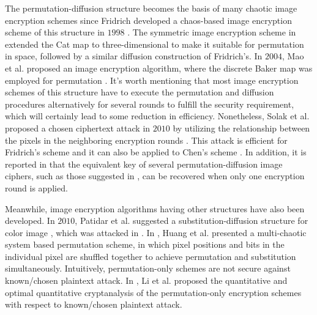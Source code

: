 \documentclass[3p,preprint,11pt]{elsarticle}
\begin{document}
The permutation-diffusion structure becomes the basis of many chaotic image encryption schemes
since Fridrich developed a chaos-based image encryption scheme of this structure in $1998$
\cite{Fridrich:ChaoticImageEncryption:IJBC98}.
The symmetric image encryption scheme in \cite{Chen:3DChaoticCipher:CSF04} extended the Cat map to
three-dimensional to make it suitable for permutation in space, followed by a similar diffusion construction of Fridrich's.
In $2004$, Mao et al. proposed an image encryption algorithm, where the discrete Baker map was
employed for permutation \cite{Mao:3Dbakermap:Optic2009}.  It's worth mentioning that most image encryption
schemes of this structure have to execute the permutation and diffusion procedures alternatively for several
rounds to fulfill the security requirement, which will certainly lead to some reduction in efficiency.
Nonetheless, Solak et al. proposed a chosen ciphertext attack in $2010$ by utilizing the relationship between
the pixels in the neighboring encryption rounds \cite{Solak:AnalyFridrich:IJBC10}.
This attack is efficient for Fridrich's scheme \cite{Fridrich:ChaoticImageEncryption:IJBC98}
and it can also be applied to Chen's scheme \cite{Chen:3DChaoticCipher:CSF04}.
In addition, it is reported in \cite{Chengqing:AnalysisFridrichstructure:IEEECirSys08} that the equivalent
key of several permutation-diffusion image ciphers, such as
those suggested in \cite{Fridrich:ChaoticImageEncryption:IJBC98,Chen:3DChaoticCipher:CSF04,
Mao:3Dbakermap:Optic2009,he:colorfridrichstruture:LNCS06},
can be recovered when only one encryption round is applied.


Meanwhile, image encryption algorithms having other structures have also been developed.
In $2010$, Patidar et al. suggested a substitution-diffusion structure for color image
\cite{Pareek:subdiffusion:CNSNS10}, which was attacked in \cite{chengqing:breakingPareek:CNSNS11}.
In \cite{Huang:pixelShuffle:Optic2009}, Huang et al. presented a multi-chaotic system based
permutation scheme, in which pixel positions and bits in
the individual pixel are shuffled together to achieve permutation and substitution simultaneously.
Intuitively, permutation-only schemes are not secure against known/chosen plaintext attack. In \cite{Chengqing:OptimalofPermutation:SG11,Shujun:quantitativePermutation:SGIC08},
Li et al. proposed the quantitative and optimal quantitative cryptanalysis of the permutation-only encryption
schemes with respect to known/chosen plaintext attack.
\end{document}
